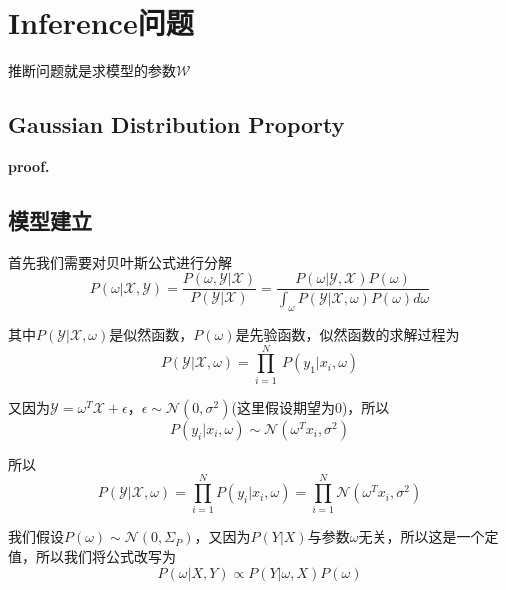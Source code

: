 \chapter{Inference问题}

推断问题就是求模型的参数$\mathcal{W}$

\section{Gaussian Distribution Proporty}

\begin{mdframed}
    \begin{theorem}
    \end{theorem}
\end{mdframed}
\begin{mdframed}[backgroundcolor=gray!15,linewidth=0pt]
    \textbf{proof. }
\end{mdframed}

\section{模型建立}

首先我们需要对贝叶斯公式进行分解
\begin{equation}
    P(\omega|\mathcal{X},\mathcal{Y})=\frac{P(\omega,\mathcal{Y}|\mathcal{X})}{P(\mathcal{Y}|\mathcal{X})}=\frac{P(\omega|\mathcal{Y},\mathcal{X})P(\omega)}{\int_{\omega}P(\mathcal{Y}|\mathcal{X},\omega)P(\omega)d\omega}
\end{equation}

其中$P(\mathcal{Y}|\mathcal{X},\omega)$是似然函数，$P(\omega)$是先验函数，似然函数的求解过程为
\begin{equation}
    P(\mathcal{Y}|\mathcal{X},\omega)=\prod_{i=1}^{N}\ P(y_1|x_i,\omega)
\end{equation}

又因为$\mathcal{Y}=\omega^T\mathcal{X}+\epsilon$，$\epsilon\sim \mathcal{N}(0,\sigma^2)$(这里假设期望为0)，所以
\begin{equation}
    P(y_i|x_i,\omega)\sim \mathcal{N}(\omega^Tx_i,\sigma^2)
\end{equation}

所以
\begin{equation}
    P(\mathcal{Y}|\mathcal{X},\omega)=\prod_{i=1}^{N}P(y_i|x_i,\omega)=\prod_{i=1}^{N} \mathcal{N}(\omega^Tx_i,\sigma^2)
\end{equation}

我们假设$P(\omega)\sim \mathcal{N}(0,\varSigma_P)$，又因为$P(Y|X)$与参数$\omega$无关，所以这是一个定值，所以我们将公式改写为
\begin{equation}
    P(\omega|X,Y)\propto P(Y|\omega,X)P(\omega)
\end{equation}

